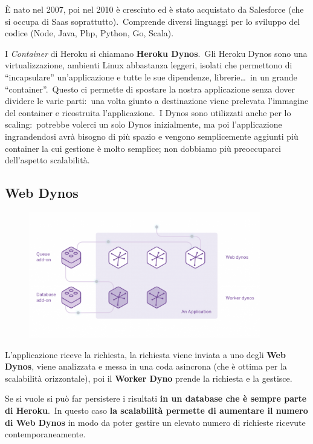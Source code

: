 È nato nel 2007, poi nel 2010 è cresciuto ed è stato acquistato da Salesforce (che si occupa di Saas soprattutto).\
Comprende diversi linguaggi per lo sviluppo del codice (Node, Java, Php, Python, Go, Scala).\

I \textit{Container} di Heroku si chiamano \textbf{Heroku Dynos}.\
Gli Heroku Dynos sono una virtualizzazione, ambienti Linux abbastanza leggeri, isolati che permettono di ``incapsulare'' un'applicazione e tutte le sue dipendenze, librerie\dots\ in un grande ``container''.\
Questo ci permette di spostare la nostra applicazione senza dover dividere le varie parti:\ una volta giunto a destinazione viene prelevata l'immagine del container e ricostruita l'applicazione.\
I Dynos sono utilizzati anche per lo scaling:\ potrebbe volerci un solo Dynos inizialmente, ma poi l'applicazione ingrandendosi avrà bisogno di più spazio e vengono semplicemente aggiunti più container la cui gestione è molto semplice; non dobbiamo più preoccuparci dell'aspetto scalabilità.\

\subsection{Web Dynos}

\begin{figure}[H]
    \centering
    \includegraphics[width=0.9\textwidth]{immagini/Heroku_Dynos.png}
\end{figure}

L'applicazione riceve la richiesta, la richiesta viene inviata a uno degli \textbf{Web Dynos}, viene analizzata e messa in una coda asincrona (che è ottima per la scalabilità orizzontale), poi il \textbf{Worker Dyno} prende la richiesta e la gestisce.\

Se si vuole si può far persistere i risultati \textbf{in un database che è sempre parte di Heroku}.\
In questo caso \textbf{la scalabilità permette di aumentare il numero di Web Dynos} in modo da poter gestire un elevato numero di richieste ricevute contemporaneamente.\
